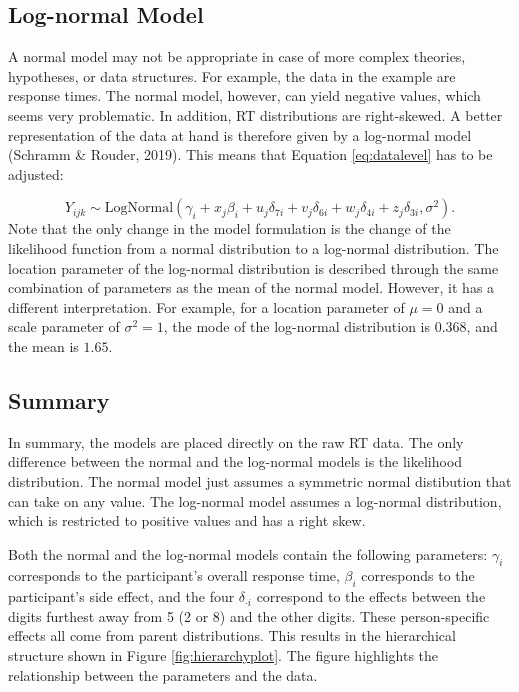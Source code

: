 \documentclass[
  english,
  doc,floatsintext]{apa6}
\begin{document}
\hypertarget{log-normal-model}{%
\subsection{Log-normal Model}\label{log-normal-model}}

A normal model may not be appropriate in case of more complex theories, hypotheses, or data structures. For example, the data in the example are response times. The normal model, however, can yield negative values, which seems very problematic. In addition, RT distributions are right-skewed. A better representation of the data at hand is therefore given by a log-normal model (Schramm \& Rouder, 2019). This means that Equation \eqref{eq:datalevel} has to be adjusted:

\begin{equation}
Y_{ijk} \sim \text{LogNormal}(\gamma_{i} + x_j \beta_{i} + u_j \delta_{7i} + v_j \delta_{6i} + w_j \delta_{4i} + z_j \delta_{3i}, \sigma^2).  
\end{equation}
Note that the only change in the model formulation is the change of the likelihood function from a normal distribution to a log-normal distribution. The location parameter of the log-normal distribution is described through the same combination of parameters as the mean of the normal model. However, it has a different interpretation. For example, for a location parameter of \(\mu = 0\) and a scale parameter of \(\sigma^2 = 1\), the mode of the log-normal distribution is \(0.368\), and the mean is \(1.65\).

\hypertarget{summary}{%
\subsection{Summary}\label{summary}}

In summary, the models are placed directly on the raw RT data. The only difference between the normal and the log-normal models is the likelihood distribution. The normal model just assumes a symmetric normal distibution that can take on any value. The log-normal model assumes a log-normal distribution, which is restricted to positive values and has a right skew.

Both the normal and the log-normal models contain the following parameters: \(\gamma_i\) corresponds to the participant's overall response time, \(\beta_i\) corresponds to the participant's side effect, and the four \(\delta_{\cdot i}\) correspond to the effects between the digits furthest away from 5 (2 or 8) and the other digits. These person-specific effects all come from parent distributions. This results in the hierarchical structure shown in Figure \ref{fig:hierarchyplot}. The figure highlights the relationship between the parameters and the data.
\end{document}
